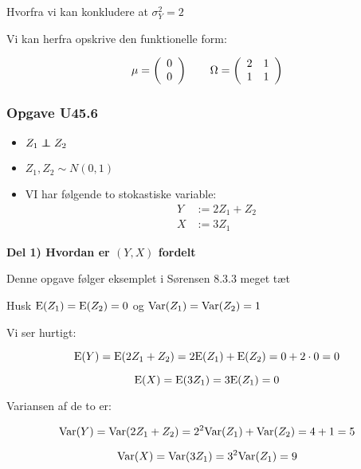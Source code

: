 Hvorfra vi kan konkludere at $\sigma_Y^2 = 2$

Vi kan herfra opskrive den funktionelle form:

\begin{equation}
    \mu = \left( 
    \begin{array}{cc}
         0 \\
         0 
    \end{array}\right) \qquad
    \Omega = \left(
    \begin{array}{cc}
        2 & 1 \\
        1 & 1
    \end{array} \right)
\end{equation}

\subsubsection{Opgave U45.6}

\begin{itemize}
    \item $Z_1 \independent Z_2$
    \item $Z_1, Z_2 \sim N(0,1)$
    \item VI har følgende to stokastiske variable:
    \begin{align}
        Y &:= 2Z_1 +Z_2 \\
        X &:= 3Z_1
    \end{align}
\end{itemize}

\textbf{Del 1) Hvordan er $(Y, X)$ fordelt}

Denne opgave følger eksemplet i Sørensen 8.3.3 meget tæt

Husk $\text{E}(Z_1) = \text{E}(Z_2) = 0$ og $\text{Var}(Z_1) = \text{Var}(Z_2) = 1$

Vi ser hurtigt:

\begin{equation}
    \text{E}(Y) = \text{E}(2Z_1 +Z_2) = 2\text{E}(Z_1) + \text{E}(Z_2) = 0 + 2\cdot0 = 0
\end{equation}

\begin{equation}
    \text{E}(X) = \text{E}(3Z_1) = 3\text{E}(Z_1) = 0
\end{equation}

Variansen af de to er:

\begin{equation}
    \text{Var}(Y) = \text{Var}(2Z_1 +Z_2) = 2^2 \text{Var}(Z_1) + \text{Var}(Z_2) = 4 + 1 = 5
\end{equation}

\begin{equation}
    \text{Var}(X) = \text{Var}(3Z_1) = 3^2 \text{Var}(Z_1) = 9
\end{equation}

